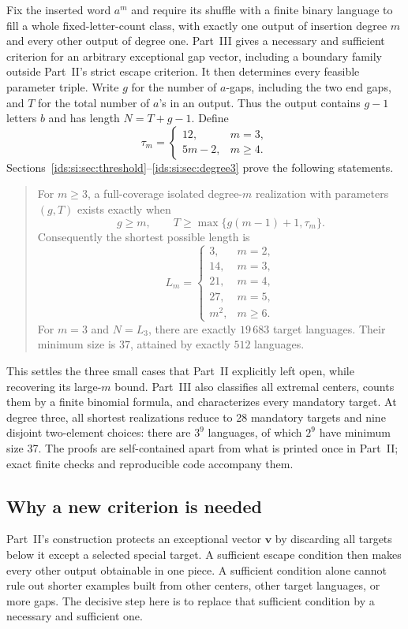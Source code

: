 \documentclass[11pt,letterpaper]{article}
\theoremstyle{definition}\newtheorem{definition}[theorem]{Definition}
\theoremstyle{remark}\newtheorem{remark}[theorem]{Remark}
\theoremstyle{definition}\newtheorem{question}[theorem]{Question}
\begin{document}
Fix the inserted word $a^m$ and require its shuffle with a finite binary
language to fill a whole fixed-letter-count class, with exactly one output of
insertion degree $m$ and every other output of degree one. Part~III gives a
necessary and sufficient criterion for an arbitrary exceptional gap vector,
including a boundary family outside Part~II's strict escape criterion. It then
determines every feasible parameter triple. Write $g$ for the number of
$a$-gaps, including the two end gaps, and $T$ for the total number of $a$'s in
an output. Thus the output contains $g-1$ letters $b$ and has length
$N=T+g-1$. Define
\begin{equation}\label{ids:si:eq:tau}
 \tau_m=\begin{cases}12,&m=3,\\5m-2,&m\geq4.\end{cases}
\end{equation}
Sections~\ref{ids:si:sec:threshold}--\ref{ids:si:sec:degree3} prove the
following statements.
\begin{quote}
For $m\geq3$, a full-coverage isolated degree-$m$ realization with parameters
$(g,T)$ exists exactly when
\[
 g\geq m,\qquad T\geq\max\{g(m-1)+1,\tau_m\}.
\]
Consequently the shortest possible length is
\[
 L_m=\begin{cases}
 3,&m=2,\\14,&m=3,\\21,&m=4,\\27,&m=5,\\m^2,&m\geq6.
 \end{cases}
\]
For $m=3$ and $N=L_3$, there are exactly $19\,683$ target languages.
Their minimum size is $37$, attained by exactly $512$ languages.
\end{quote}
This settles the three small cases that Part~II explicitly left open, while
recovering its large-$m$ bound. Part~III also classifies all extremal centers,
counts them by a finite binomial formula, and characterizes every mandatory
target. At degree three, all shortest realizations reduce to 28 mandatory
targets and nine disjoint two-element choices: there are $3^9$ languages, of
which $2^9$ have minimum size 37. The proofs are self-contained apart from
what is printed once in Part~II; exact finite checks and reproducible code
accompany them.

\subsection{Why a new criterion is needed}\label{ids:si:sec:why}
Part~II's construction protects an exceptional vector $\mathbf v$ by
discarding all targets below it except a selected special target. A
sufficient escape condition then makes every other output obtainable in one
piece. A sufficient condition alone cannot rule out shorter examples built
from other centers, other target languages, or more gaps. The decisive step
here is to replace that sufficient condition by a necessary and sufficient
one.
\end{document}
